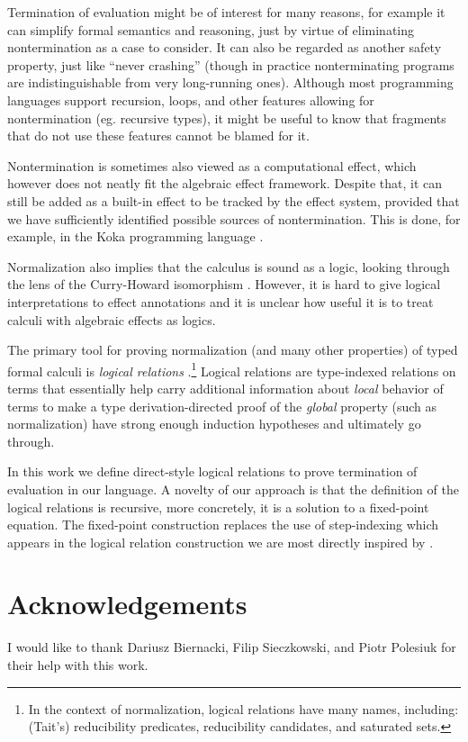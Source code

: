 \documentclass[a4paper, 11pt,titlepage, openright, twoside]{report}
\newcommand{\+}{\enspace}
\begin{document}
Termination of evaluation might be of interest for many reasons,
for example it can simplify formal semantics and reasoning, just by virtue of
eliminating nontermination as a case to consider.
It can also be regarded as another safety property, just like ``never crashing''
(though in practice nonterminating programs are indistinguishable from {very long}-running ones).
Although most programming languages support recursion, loops, and other
features allowing for nontermination (eg. recursive types),
it might be useful to know that fragments that do not use these features cannot be blamed
for it.

Nontermination is sometimes also viewed as a computational effect,
which however does not neatly fit the algebraic effect framework.
Despite that, it can still be added as a built-in effect to be tracked by
the effect system, provided that we have sufficiently identified possible sources
of nontermination.
This is done, for example, in the Koka programming language \cite{koka}.

Normalization also implies that the calculus is sound as a logic,
looking through the lens of the Curry-Howard isomorphism \cite{ch}.
However, it is hard to give logical interpretations to effect annotations \cite{oleg}
and it is unclear how useful it is to treat calculi with algebraic effects as logics.

The primary tool for proving normalization (and many other properties) of
typed formal calculi is {\em logical relations} \cite{lr}.\footnote{
	In the context of normalization, logical relations have many names, including:
	(Tait's) reducibility predicates, reducibility candidates, and saturated sets.
}
Logical relations are
type-indexed relations on terms that essentially help carry additional
information about {\em local} behavior of terms to make a type derivation-directed
proof of the {\em global} property (such as normalization)
have strong enough induction hypotheses and ultimately go through.

In this work we define direct-style logical relations
to prove termination
of evaluation in our language.
A novelty of our approach
is that the definition of the logical relations
is recursive, more concretely, it is a solution to a fixed-point equation.
The fixed-point construction replaces the use of step-indexing
which appears in the logical relation construction we are most directly inspired by \cite{hwc}.

\section{Acknowledgements}
I would like to thank Dariusz Biernacki, Filip Sieczkowski, and Piotr Polesiuk
for their help with this work.
\end{document}
